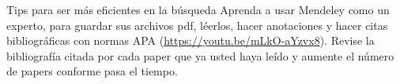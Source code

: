 \documentclass[9pt]{beamer}
\begin{document}
\begin{frame}{Tips para ser más eficientes en la búsqueda}
Aprenda a usar Mendeley como un experto, para guardar sus archivos pdf, léerlos, hacer anotaciones y hacer citas bibliográficas con normas APA (\color{blue!46!green}\url{https://youtu.be/mLkO-aYzvx8}\color{gray!72!black}). Revise la bibliografía citada por cada paper que ya usted haya leído y aumente el número de papers conforme pasa el tiempo. 
\end{frame}






%
%
\end{document}
